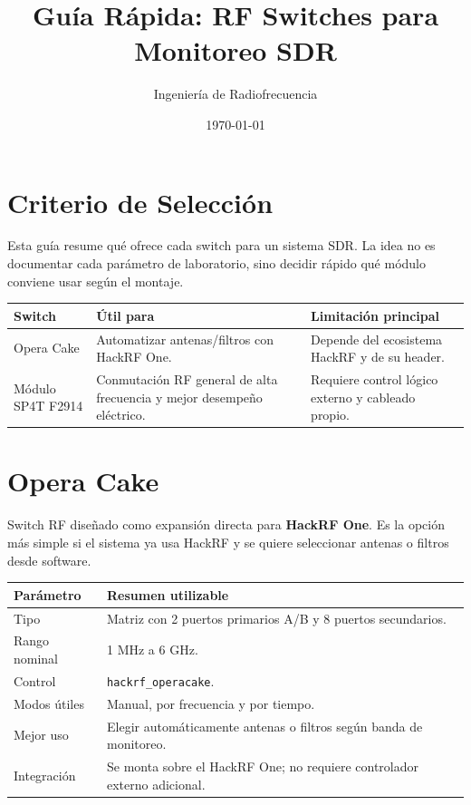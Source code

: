 \documentclass[11pt]{article}
\title{Guía Rápida: RF Switches para Monitoreo SDR}
\author{Ingeniería de Radiofrecuencia}
\date{\today}
\begin{document}
\maketitle
\tableofcontents
\newpage

\section{Criterio de Selección}

Esta guía resume qué ofrece cada switch para un sistema SDR. La idea no es documentar cada parámetro de laboratorio, sino decidir rápido qué módulo conviene usar según el montaje.

\begin{table}[h]
    \centering
    \small
    \begin{tabular}{p{}p{}p{}}
        \toprule
        \textbf{Switch} & \textbf{Útil para} & \textbf{Limitación principal} \\
        \midrule
        Opera Cake & Automatizar antenas/filtros con HackRF One. & Depende del ecosistema HackRF y de su header. \\
        Módulo SP4T F2914 & Conmutación RF general de alta frecuencia y mejor desempeño eléctrico. & Requiere control lógico externo y cableado propio. \\
        \bottomrule
    \end{tabular}
\end{table}

\section{Opera Cake}

Switch RF diseñado como expansión directa para \textbf{HackRF One}. Es la opción más simple si el sistema ya usa HackRF y se quiere seleccionar antenas o filtros desde software.

\begin{table}[h]
    \centering
    \small
    \begin{tabular}{p{}p{}}
        \toprule
        \textbf{Parámetro} & \textbf{Resumen utilizable} \\
        \midrule
        Tipo & Matriz con 2 puertos primarios A/B y 8 puertos secundarios. \\
        Rango nominal & 1 MHz a 6 GHz. \\
        Control & \texttt{hackrf\_operacake}. \\
        Modos útiles & Manual, por frecuencia y por tiempo. \\
        Mejor uso & Elegir automáticamente antenas o filtros según banda de monitoreo. \\
        Integración & Se monta sobre el HackRF One; no requiere controlador externo adicional. \\
        \bottomrule
    \end{tabular}
\end{table}
\end{document}
